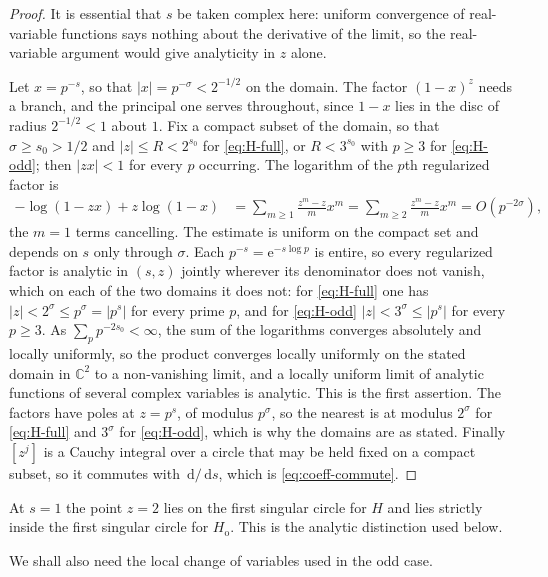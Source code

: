 \documentclass[11pt]{amsart}
\theoremstyle{plain}
\theoremstyle{definition}
\newcommand{\e}{\mathrm e}
\newcommand{\dd}{\,\mathrm d}
\newcommand{\abs}[1]{\lvert #1\rvert}
\begin{document}
\begin{proof}
It is essential that $s$ be taken complex here: uniform convergence of
real-variable functions says nothing about the derivative of the limit, so the
real-variable argument would give analyticity in $z$ alone.

Let $x=p^{-s}$, so that $\abs x=p^{-\sigma}<2^{-1/2}$ on the domain. The
factor $(1-x)^z$ needs a branch, and the principal one serves throughout,
since $1-x$ lies in the disc of radius $2^{-1/2}<1$ about $1$. Fix a compact
subset of the domain, so that $\sigma\geq s_0>1/2$ and $\abs z\leq R<2^{s_0}$
for \eqref{eq:H-full}, or $R<3^{s_0}$ with $p\geq3$ for \eqref{eq:H-odd}; then
$\abs{zx}<1$ for every $p$ occurring. The logarithm of the $p$th regularized
factor is
\begin{align}
 -\log(1-zx)+z\log(1-x)
 &=\sum_{m\geq1}\frac{z^m-z}{m}x^m
  =\sum_{m\geq2}\frac{z^m-z}{m}x^m
  =O(p^{-2\sigma}),                       \label{eq:reg-factor-log}
\end{align}
the $m=1$ terms cancelling. The estimate is uniform on the compact set and
depends on $s$ only through $\sigma$. Each $p^{-s}=\e^{-s\log p}$ is entire,
so every regularized factor is analytic in $(s,z)$ jointly wherever its
denominator does not vanish, which on each of the two domains it does not: for
\eqref{eq:H-full} one has $\abs z<2^{\sigma}\leq p^{\sigma}=\abs{p^{s}}$ for
every prime $p$, and for \eqref{eq:H-odd} $\abs z<3^{\sigma}\leq\abs{p^{s}}$
for every $p\geq3$. As $\sum_pp^{-2s_0}<\infty$, the sum of the logarithms
converges absolutely and locally uniformly, so the product converges locally
uniformly on the stated domain in $\mathbb C^2$ to a non-vanishing limit, and
a locally uniform limit of analytic functions of several complex variables is
analytic. This is the first assertion. The factors have poles at $z=p^s$, of
modulus $p^{\sigma}$, so the nearest is at modulus $2^{\sigma}$ for
\eqref{eq:H-full} and $3^{\sigma}$ for \eqref{eq:H-odd}, which is why the
domains are as stated. Finally $[z^j]$ is a
Cauchy integral over a circle that may be held fixed on a compact subset, so
it commutes with $\dd/\dd s$, which is \eqref{eq:coeff-commute}.
\end{proof}

At $s=1$ the point $z=2$ lies on the first singular circle for $H$ and lies
strictly inside the first singular circle for $H_{\mathrm o}$. This is the
analytic distinction used below.

We shall also need the local change of variables used in the odd case.
\end{document}
